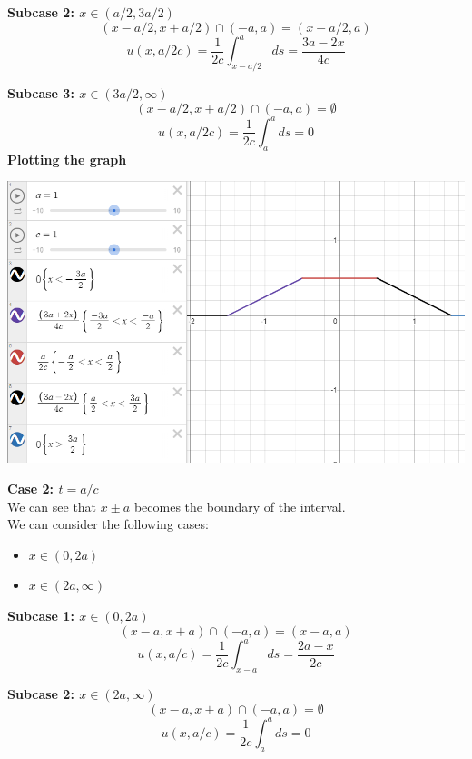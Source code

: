 \documentclass[answers,12pt,addpoints]{exam}
\begin{document}
\begin{questions}
\textbf{Subcase 2: $x \in (a/2, 3a/2)$}\\
$$(x-a/2, x+a/2) \cap (-a,a) = (x-a/2, a)$$
$$u(x,a/2c) = \frac{1}{2c} \int_{x-a/2}^{a} ds = \frac{3a-2x}{4c}$$

\textbf{Subcase 3: $x \in (3a/2, \infty)$}\\
$$(x-a/2, x+a/2) \cap (-a,a) = \emptyset$$
$$u(x,a/2c) = \frac{1}{2c} \int_{a}^{a} ds = 0$$
\textbf{Plotting the graph}\\
\begin{center}
    \includegraphics[scale = 0.5]{HW3IMG/11.png}
\end{center}



\textbf{Case 2: $t = a/c$}\\
We can see that $x \pm a$ becomes the boundary of the interval. \\
We can consider the following cases:
\begin{itemize}
    \item $ x \in (0, 2a)$
    \item $ x \in (2a, \infty)$
\end{itemize}
\textbf{Subcase 1: $x \in (0, 2a)$}\\
$$(x-a, x+a) \cap (-a,a) = (x-a, a)$$
$$u(x,a/c) = \frac{1}{2c} \int_{x-a}^{a} ds = \frac{2a-x}{2c}$$

\textbf{Subcase 2: $x \in (2a, \infty)$}\\
$$(x-a, x+a) \cap (-a,a) = \emptyset$$
$$u(x,a/c) = \frac{1}{2c} \int_{a}^{a} ds = 0$$


\end{questions}
\end{document}
